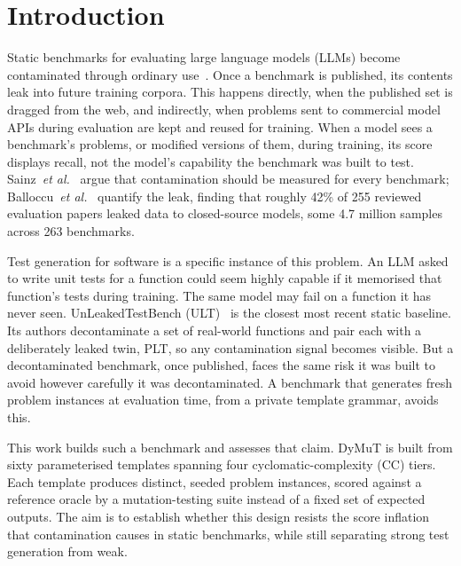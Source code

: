 \section{Introduction}
\label{sec:introduction}

Static benchmarks for evaluating large language models (LLMs) become contaminated through ordinary use~\cite{sainz2023contamination}. Once a benchmark is published, its contents leak into future training corpora. This happens directly, when the published set is dragged from the web, and indirectly, when problems sent to commercial model APIs during evaluation are kept and reused for training. When a model sees a benchmark's problems, or modified versions of them, during training, its score displays recall, not the model's capability the benchmark was built to test. Sainz~\emph{et al.}~\cite{sainz2023contamination} argue that contamination should be measured for every benchmark; Balloccu~\emph{et al.}~\cite{balloccu2024leakcheat} quantify the leak, finding that roughly 42\% of 255 reviewed evaluation papers leaked data to closed-source models, some 4.7 million samples across 263 benchmarks. %

Test generation for software is a specific instance of this problem. An LLM asked to write unit tests for a function could seem highly capable if it memorised that function's tests during training. The same model may fail on a function it has never seen. UnLeakedTestBench (ULT)~\cite{huang2026ult} is the closest most recent static baseline. Its authors decontaminate a set of real-world functions and pair each with a deliberately leaked twin, PLT, so any contamination signal becomes visible. But a decontaminated benchmark, once published, faces the same risk it was built to avoid however carefully it was decontaminated. A benchmark that generates fresh problem instances at evaluation time, from a private template grammar, avoids this.

This work builds such a benchmark and assesses that claim. DyMuT is built from sixty parameterised templates spanning four cyclomatic-complexity (CC) tiers. Each template produces distinct, seeded problem instances, scored against a reference oracle by a mutation-testing suite instead of a fixed set of expected outputs. The aim is to establish whether this design resists the score inflation that contamination causes in static benchmarks, while still separating strong test generation from weak.

